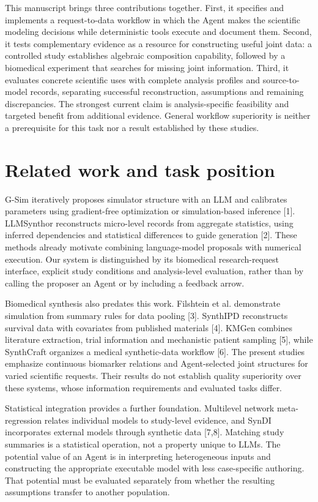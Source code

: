 \documentclass[11pt,letterpaper]{article}
\begin{document}
This manuscript brings three contributions together. First, it specifies and implements a request-to-data workflow in which the Agent makes the scientific modeling decisions while deterministic tools execute and document them. Second, it tests complementary evidence as a resource for constructing useful joint data: a controlled study establishes algebraic composition capability, followed by a biomedical experiment that searches for missing joint information. Third, it evaluates concrete scientific uses with complete analysis profiles and source-to-model records, separating successful reconstruction, assumptions and remaining discrepancies. The strongest current claim is analysis-specific feasibility and targeted benefit from additional evidence. General workflow superiority is neither a prerequisite for this task nor a result established by these studies.



\section{Related work and task position}

G-Sim iteratively proposes simulator structure with an LLM and calibrates parameters using gradient-free optimization or simulation-based inference [1]. LLMSynthor reconstructs micro-level records from aggregate statistics, using inferred dependencies and statistical differences to guide generation [2]. These methods already motivate combining language-model proposals with numerical execution. Our system is distinguished by its biomedical research-request interface, explicit study conditions and analysis-level evaluation, rather than by calling the proposer an Agent or by including a feedback arrow.


Biomedical synthesis also predates this work. Filshtein et al. demonstrate simulation from summary rules for data pooling [3]. SynthIPD reconstructs survival data with covariates from published materials [4]. KMGen combines literature extraction, trial information and mechanistic patient sampling [5], while SynthCraft organizes a medical synthetic-data workflow [6]. The present studies emphasize continuous biomarker relations and Agent-selected joint structures for varied scientific requests. Their results do not establish quality superiority over these systems, whose information requirements and evaluated tasks differ.


Statistical integration provides a further foundation. Multilevel network meta-regression relates individual models to study-level evidence, and SynDI incorporates external models through synthetic data [7,8]. Matching study summaries is a statistical operation, not a property unique to LLMs. The potential value of an Agent is in interpreting heterogeneous inputs and constructing the appropriate executable model with less case-specific authoring. That potential must be evaluated separately from whether the resulting assumptions transfer to another population.
\end{document}
